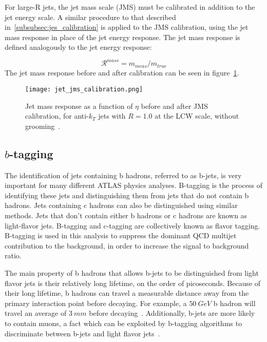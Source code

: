 For large-R jets, the jet mass scale (JMS) must be calibrated in addition to the jet energy scale.
A similar procedure to that described in~\ref{subsubsec:jes_calibration} is applied to the JMS calibration, using the jet mass response in place of the jet energy response.
The jet mass response is defined analogously to the jet energy response:

\begin{equation}\label{eq:jet_mass_response}
    \mathcal{R}^{mass} = m_{meas} / m_{true}
\end{equation}
The jet mass response before and after calibration can be seen in figure~\ref{fig:jet_jms_response}.

\begin{figure}[!ht]
    \centering
\texttt{[image: jet\_jms\_calibration.png]}
\caption{Jet mass response as a function of $\eta$ before and after JMS calibration, for anti-$k_T$ jets
with $R=1.0$ at the LCW scale, without grooming~\cite{jet-substructure-perf}.}
\label{fig:jet_jms_response}
\end{figure}

\subsection{$b$-tagging}\label{subsec:jet_b_tagging}

The identification of jets containing b hadrons, referred to as b-jets, is very important for many different ATLAS physics analyses.
B-tagging is the process of identifying these jets and distinguishing them from jets that do not contain b hadrons.
Jets containing c hadrons can also be distinguished using similar methods.
Jets that don't contain either b hadrons or c hadrons are known as light-flavor jets.
B-tagging and c-tagging are collectively known as flavor tagging.
B-tagging is used in this analysis to suppress the dominant QCD multijet contribution to the background, in order to increase the signal to background ratio.

The main property of b hadrons that allows b-jets to be distinguished from light flavor jets is their relatively long lifetime, on the order of picoseconds.
Because of their long lifetime, b hadrons can travel a measurable distance away from the primary interaction point before decaying.
For example, a $50~GeV$ b hadron will travel an average of $3~mm$ before decaying~\cite{jet-bjet-perf}.
Additionally, b-jets are more likely to contain muons, a fact which can be exploited by b-tagging
algorithms to discriminate between b-jets and light flavor jets~\cite{jet-bjet-perf}.

